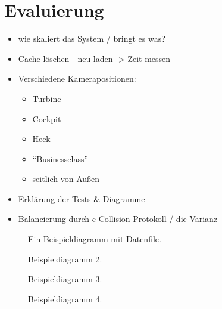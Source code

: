 \chapter{Evaluierung}
\label{chap:eval}
%
\begin{itemize}
 \item wie skaliert das System / bringt es was?
 \item Cache löschen - neu laden -> Zeit messen
 \item Verschiedene Kamerapositionen:
 \begin{itemize}
  \item Turbine
  \item Cockpit
  \item Heck
  \item ``Businessclass''
  \item seitlich von Außen
 \end{itemize}
 \item Erklärung der Tests \& Diagramme
 \item Balancierung durch c-Collision Protokoll / die Varianz
\end{itemize}
%




\begin{figure}
\centering

  \caption{Ein Beispieldiagramm mit Datenfile.}
  \label{fig:eval:diag1}
\end{figure}

\begin{figure}
\centering

  \caption{Beispieldiagramm 2.}
  \label{fig:eval:diag2}
\end{figure}

\begin{figure}
\centering

  \caption{Beispieldiagramm 3.}
  \label{fig:eval:diag3}
\end{figure}

\begin{figure}
\centering

  \caption{Beispieldiagramm 4.}
  \label{fig:eval:diag4}
\end{figure}

